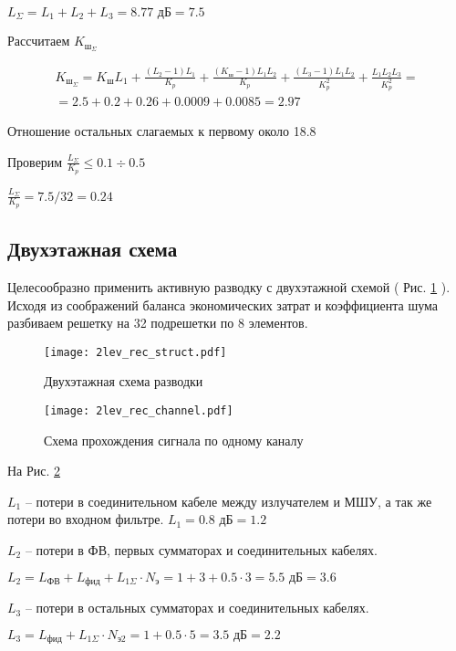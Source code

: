 $L_\Sigma=L_1+L_2+L_3=8.77 \text{ дБ}=7.5$

Рассчитаем $K_{\text{ш}_\Sigma}$

\begin{multline*} \displaystyle K_{\text{ш}_\Sigma}=K_\text{ш}L_1+\frac{(L_2-1)L_1}{K_p}+\frac{(K_\text{ш}-1)L_1L_2}{K_p}+\frac{(L_3-1)L_1L_2}{K^2_p}+\frac{L_1L_2L_3}{K^2_p}=\\=2.5+0.2+0.26+0.0009+0.0085=2.97 \end{multline*}

Отношение остальных слагаемых к первому около 18.8%

Проверим $\displaystyle \frac{L_\Sigma}{K_p}\leq 0.1\div0.5$

 $\displaystyle \frac{L_\Sigma}{K_p}=7.5/32=0.24$
 
 \subsection{Двухэтажная схема}
 Целесообразно применить активную разводку с двухэтажной схемой ( Рис. \ref{fig:2lev_rec_struct} ). Исходя из соображений баланса экономических затрат и коэффициента шума разбиваем решетку на 32 подрешетки по 8 элементов.
 
 \begin{figure}[H]
 	\centering
 	\texttt{[image: 2lev\_rec\_struct.pdf]}
 	\caption{Двухэтажная схема разводки}
 	\label{fig:2lev_rec_struct}
 \end{figure}

\begin{figure}[H]
	\centering
	\texttt{[image: 2lev\_rec\_channel.pdf]}
	\caption{Схема прохождения сигнала по одному каналу}
	\label{fig:2lev_rec_channel}
\end{figure}

На Рис. \ref{fig:2lev_rec_channel} 

$L_1$ -- потери в соединительном кабеле между излучателем и МШУ, а так же потери во входном фильтре. $L_1=0.8\text{ дБ}=1.2$

$L_2$ -- потери в ФВ, первых сумматорах и соединительных кабелях.

$L_2=L_\text{ФВ}+L_\text{фид}+L_{1\Sigma}\cdot N_\text{э}=1+3+0.5\cdot3=5.5\text{ дБ}=3.6$

$L_3$ -- потери в остальных сумматорах и соединительных кабелях.

$L_3=L_\text{фид}+L_{1\Sigma}\cdot N_\text{э2}=1+0.5\cdot5=3.5 \text{ дБ}=2.2$

